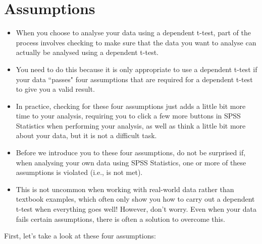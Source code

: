 \documentclass[]{article}
\begin{document}
	
\section*{Assumptions}
\begin{itemize}
	\item 	When you choose to analyse your data using a dependent t-test, part of the process involves checking to make sure that the data you want to analyse can actually be analysed using a dependent t-test. 
	
	\item You need to do this because it is only appropriate to use a dependent t-test if your data ``passes" four assumptions that are required for a dependent t-test to give you a valid result. 
	
	
	\item In practice, checking for these four assumptions just adds a little bit more time to your analysis, requiring you to click a few more buttons in SPSS Statistics when performing your analysis, as well as think a little bit more about your data, but it is not a difficult task.
	
	\item Before we introduce you to these four assumptions, do not be surprised if, when analysing your own data using SPSS Statistics, one or more of these assumptions is violated (i.e., is not met). 
	
	\item This is not uncommon when working with real-world data rather than textbook examples, which often only show you how to carry out a dependent t-test when everything goes well! However, don't worry. Even when your data fails certain assumptions, there is often a solution to overcome this.
	
\end{itemize}


First, let's take a look at these four assumptions:
\end{document}
